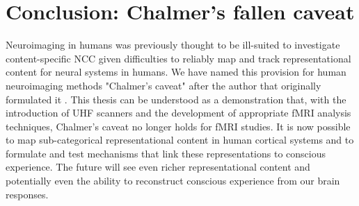 \section{Conclusion: Chalmer's fallen caveat}
Neuroimaging in humans was previously thought to be ill-suited to investigate content-specific NCC given difficulties to reliably map and track representational content for neural systems in humans. We have named this provision for human neuroimaging methods "Chalmer's caveat" after the author that originally formulated it \parencite{Chalmers2000}. This thesis can be understood as a demonstration that, with the introduction of UHF scanners and the development of appropriate fMRI analysis techniques, Chalmer's caveat no longer holds for fMRI studies. It is now possible to map sub-categorical representational content in human cortical systems and to formulate and test mechanisms that link these representations to conscious experience. The future will see even richer representational content and potentially even the ability to reconstruct conscious experience from our brain responses.

\clearpage
\printbibliography[heading=subbibnumbered, title={References}]

